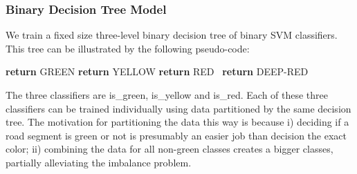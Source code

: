 %

\subsubsection{Binary Decision Tree Model}
We train a fixed size three-level binary decision tree of binary SVM classifiers. This tree can be illustrated by the following pseudo-code:
\begin{algorithmic}
 \textbf{return} GREEN
 \textbf{return} YELLOW
 \textbf{return} RED
\Else ~\textbf{return} DEEP-RED
\EndIf
\EndFunction
\end{algorithmic}
 
The three classifiers are is\_green, is\_yellow and is\_red. Each of these three classifiers
can be trained individually using data partitioned by the same decision tree.
The motivation for partitioning the data this way is because i) deciding if a road
segment is green or not is presumably an easier job than decision the exact color;
ii) combining the data for all non-green classes creates a bigger classes, 
partially alleviating the imbalance problem.

